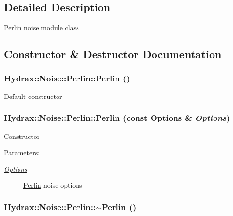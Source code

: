 \subsection{Detailed Description}
\hyperlink{class_hydrax_1_1_noise_1_1_perlin}{Perlin} noise module class 

\subsection{Constructor \& Destructor Documentation}
\hypertarget{class_hydrax_1_1_noise_1_1_perlin_65eccde5668e55133aef2f57f02613c2}{
\subsubsection[{Perlin}]{\setlength{\rightskip}{0pt plus 5cm}Hydrax::Noise::Perlin::Perlin ()}}
\label{class_hydrax_1_1_noise_1_1_perlin_65eccde5668e55133aef2f57f02613c2}


Default constructor \hypertarget{class_hydrax_1_1_noise_1_1_perlin_363743192e0e9e9ab8bc4ff9f771e06c}{
\subsubsection[{Perlin}]{\setlength{\rightskip}{0pt plus 5cm}Hydrax::Noise::Perlin::Perlin (const {\bf Options} \& {\em Options})}}
\label{class_hydrax_1_1_noise_1_1_perlin_363743192e0e9e9ab8bc4ff9f771e06c}


Constructor \begin{Desc}
\item[Parameters:]
\begin{description}
\item[{\em \hyperlink{struct_hydrax_1_1_noise_1_1_perlin_1_1_options}{Options}}]\hyperlink{class_hydrax_1_1_noise_1_1_perlin}{Perlin} noise options \end{description}
\end{Desc}
\hypertarget{class_hydrax_1_1_noise_1_1_perlin_472506339005ea5196846d26bb8fd4c1}{
\subsubsection[{$\sim$Perlin}]{\setlength{\rightskip}{0pt plus 5cm}Hydrax::Noise::Perlin::$\sim$Perlin ()}}
\label{class_hydrax_1_1_noise_1_1_perlin_472506339005ea5196846d26bb8fd4c1}


